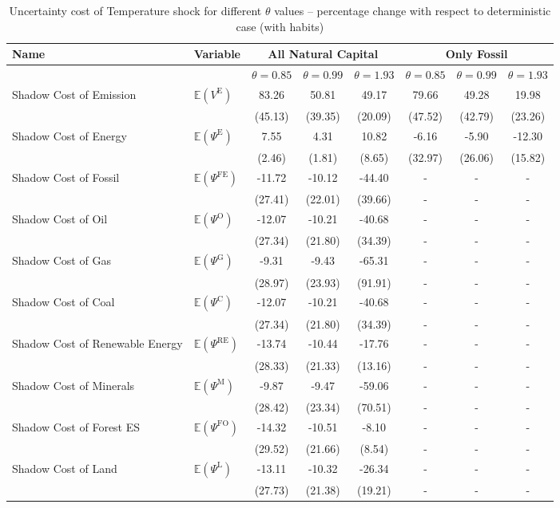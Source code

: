\begin{table}[h!]
\centering
\begin{tabular}{l l c c c c c c}
\hline
Name & Variable & \multicolumn{3}{c}{All Natural Capital} & \multicolumn{3}{c}{Only Fossil} \\
\hline
 & & $\theta = 0.85$ & $\theta = 0.99$ & $\theta = 1.93$ & $\theta = 0.85$ & $\theta = 0.99$ & $\theta = 1.93$\\
\hline
Shadow Cost of Emission & $\mathbb{E}\!\left(V^{\text{E}}\right)$ & 83.26 & 50.81 & 49.17 & 79.66 & 49.28 & 19.98 \\
 & & (45.13) & (39.35) & (20.09) & (47.52) & (42.79) & (23.26) \\
Shadow Cost of Energy & $\mathbb{E}\!\left(\Psi^{\text{E}}\right)$ & 7.55 & 4.31 & 10.82 & -6.16 & -5.90 & -12.30 \\
 & & (2.46) & (1.81) & (8.65) & (32.97) & (26.06) & (15.82) \\
Shadow Cost of Fossil & $\mathbb{E}\!\left(\Psi^{\text{FE}}\right)$ & -11.72 & -10.12 & -44.40 & - & - & - \\
 & & (27.41) & (22.01) & (39.66) & - & - & - \\
Shadow Cost of Oil & $\mathbb{E}\!\left(\Psi^{\text{O}}\right)$ & -12.07 & -10.21 & -40.68 & - & - & - \\
 & & (27.34) & (21.80) & (34.39) & - & - & - \\
Shadow Cost of Gas & $\mathbb{E}\!\left(\Psi^{\text{G}}\right)$ & -9.31 & -9.43 & -65.31 & - & - & - \\
 & & (28.97) & (23.93) & (91.91) & - & - & - \\
Shadow Cost of Coal & $\mathbb{E}\!\left(\Psi^{\text{C}}\right)$ & -12.07 & -10.21 & -40.68 & - & - & - \\
 & & (27.34) & (21.80) & (34.39) & - & - & - \\
Shadow Cost of Renewable Energy & $\mathbb{E}\!\left(\Psi^{\text{RE}}\right)$ & -13.74 & -10.44 & -17.76 & - & - & - \\
 & & (28.33) & (21.33) & (13.16) & - & - & - \\
Shadow Cost of Minerals & $\mathbb{E}\!\left(\Psi^{\text{M}}\right)$ & -9.87 & -9.47 & -59.06 & - & - & - \\
 & & (28.42) & (23.34) & (70.51) & - & - & - \\
Shadow Cost of Forest ES & $\mathbb{E}\!\left(\Psi^{\text{FO}}\right)$ & -14.32 & -10.51 & -8.10 & - & - & - \\
 & & (29.52) & (21.66) & (8.54) & - & - & - \\
Shadow Cost of Land & $\mathbb{E}\!\left(\Psi^{\text{L}}\right)$ & -13.11 & -10.32 & -26.34 & - & - & - \\
 & & (27.73) & (21.38) & (19.21) & - & - & - \\
\hline
\end{tabular}
\caption{Uncertainty cost of Temperature shock for different $\theta$ values -- percentage change with respect to deterministic case (with habits)}
\label{tab:paper_table31}
\end{table}
